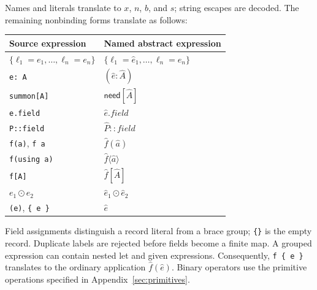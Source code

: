 \documentclass[10pt,a4paper]{article}
\newcommand{\need}[1]{\mathsf{need}[#1]}
\newcommand{\iarg}[1]{\langle#1\rangle}
\begin{document}
Names and literals translate to $x$, $n$, $b$, and $s$; string escapes are decoded.
The remaining nonbinding forms translate as follows:
\begin{center}
\renewcommand{\arraystretch}{1.18}
\begin{tabular}{@{}ll@{}}
\toprule
Source expression & Named abstract expression\\
\midrule
$\{\ell_1=e_1,\ldots,\ell_n=e_n\}$ & $\{\ell_1=\hat e_1,\ldots,\ell_n=\hat e_n\}$\\
\texttt{e: A} & $(\hat e:\hat A)$\\
\texttt{summon[A]} & $\need{\hat A}$\\
\texttt{e.field} & $\hat e.\mathit{field}$\\
\texttt{P::field} & $\hat P\mathbin{::}\mathit{field}$\\
\texttt{f(a)}, \texttt{f a} & $\hat f(\hat a)$\\
\texttt{f(using a)} & $\hat f\iarg{\hat a}$\\
\texttt{f[A]} & $\hat f[\hat A]$\\
$e_1\mathbin{\odot}e_2$ & $\hat e_1\mathbin{\odot}\hat e_2$\\
\texttt{(e)}, \texttt{\{ e \}} & $\hat e$\\
\bottomrule
\end{tabular}
\end{center}
Field assignments distinguish a record literal from a brace group; \texttt{\{\}} is
the empty record. Duplicate labels are rejected before fields become a finite map.
A grouped expression can contain nested let and given expressions.
Consequently, \texttt{f \{ e \}} translates to the ordinary application $\hat f(\hat e)$.
Binary operators use the primitive operations specified in Appendix~\ref{sec:primitives}.
\end{document}
